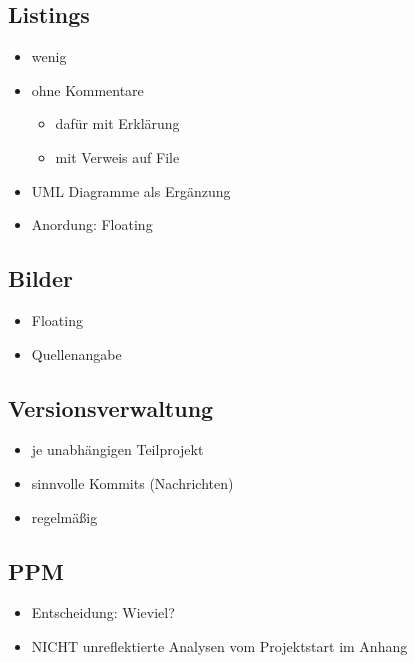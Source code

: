 \hypertarget{listings-1}{%
\subsection{Listings}\label{listings-1}}

\begin{itemize}
\item
  wenig
\item
  ohne Kommentare

  \begin{itemize}
  \tightlist
  \item
    dafür mit Erklärung
  \item
    mit Verweis auf File
  \end{itemize}
\item
  UML Diagramme als Ergänzung
\item
  Anordung: Floating
\end{itemize}

\hypertarget{bilder}{%
\subsection{Bilder}\label{bilder}}

\begin{itemize}
\tightlist
\item
  Floating
\item
  Quellenangabe
\end{itemize}

\hypertarget{versionsverwaltung}{%
\subsection{Versionsverwaltung}\label{versionsverwaltung}}

\begin{itemize}
\tightlist
\item
  je unabhängigen Teilprojekt
\item
  sinnvolle Kommits (Nachrichten)
\item
  regelmäßig
\end{itemize}

\hypertarget{ppm}{%
\subsection{PPM}\label{ppm}}

\begin{itemize}
\tightlist
\item
  Entscheidung: Wieviel?
\item
  NICHT unreflektierte Analysen vom Projektstart im Anhang
\end{itemize}

